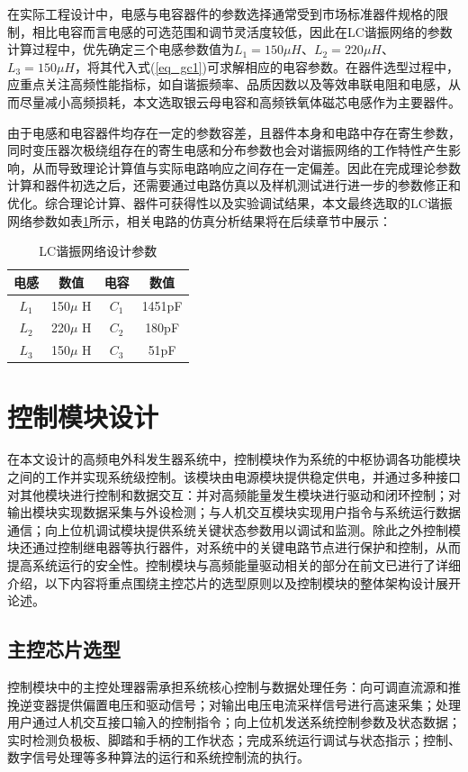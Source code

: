 在实际工程设计中，电感与电容器件的参数选择通常受到市场标准器件规格的限制，相比电容而言电感的可选范围和调节灵活度较低，因此在LC谐振网络的参数计算过程中，优先确定三个电感参数值为$L_1 = 150\mu H$、$L_2 = 220\mu H$、$L_3 = 150\mu H$，将其代入式(\ref{eq_gc1})可求解相应的电容参数。在器件选型过程中，应重点关注高频性能指标，如自谐振频率、品质因数以及等效串联电阻和电感，从而尽量减小高频损耗，本文选取银云母电容和高频铁氧体磁芯电感作为主要器件。

由于电感和电容器件均存在一定的参数容差，且器件本身和电路中存在寄生参数，同时变压器次极绕组存在的寄生电感和分布参数也会对谐振网络的工作特性产生影响，从而导致理论计算值与实际电路响应之间存在一定偏差。因此在完成理论参数计算和器件初选之后，还需要通过电路仿真以及样机测试进行进一步的参数修正和优化。综合理论计算、器件可获得性以及实验调试结果，本文最终选取的LC谐振网络参数如表\ref{LC_value}所示，相关电路的仿真分析结果将在后续章节中展示：
\begin{table}[htbp]
	\caption{\label{LC_value}LC谐振网络设计参数}
	\centering
	\small
	\setlength{\tabcolsep}{20pt}
	\begin{tabular}{c c c c }
		\hline
		电感    & 数值         & 电容    & 数值     \\
		\hline
		$L_1$ & 150$\mu$ H & $C_1$ & 1451pF \\
		$L_2$ & 220$\mu$ H & $C_2$ & 180pF  \\
		$L_3$ & 150$\mu$ H & $C_3$ & 51pF   \\
		\hline
	\end{tabular}
\end{table}

\section{控制模块设计}
在本文设计的高频电外科发生器系统中，控制模块作为系统的中枢协调各功能模块之间的工作并实现系统级控制。该模块由电源模块提供稳定供电，并通过多种接口对其他模块进行控制和数据交互：并对高频能量发生模块进行驱动和闭环控制；对输出模块实现数据采集与外设检测；与人机交互模块实现用户指令与系统运行数据通信；向上位机调试模块提供系统关键状态参数用以调试和监测。除此之外控制模块还通过控制继电器等执行器件，对系统中的关键电路节点进行保护和控制，从而提高系统运行的安全性。控制模块与高频能量驱动相关的部分在前文已进行了详细介绍，以下内容将重点围绕主控芯片的选型原则以及控制模块的整体架构设计展开论述。
\subsection{主控芯片选型}
控制模块中的主控处理器需承担系统核心控制与数据处理任务：向可调直流源和推挽逆变器提供偏置电压和驱动信号；对输出电压电流采样信号进行高速采集；处理用户通过人机交互接口输入的控制指令；向上位机发送系统控制参数及状态数据；实时检测负极板、脚踏和手柄的工作状态；完成系统运行调试与状态指示；控制、数字信号处理等多种算法的运行和系统控制流的执行。

